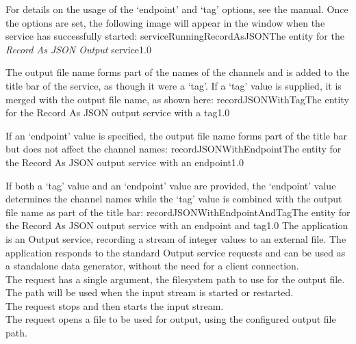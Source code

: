 For details on the usage of the `endpoint' and `tag' options, see the \emph{\CMU} manual.
Once the options are set, the following image will appear in the \emph{\CMU} window when
the service has successfully started:
%
{serviceRunningRecordAsJSON}{The \emph{\CMU} entity for the \emph{Record As JSON Output}
service}{1.0}

The output file name forms part of the names of the channels and is added to the title bar
of the service, as though it were a `tag'.
\condPage{}
If a `tag' value is supplied, it is merged with the output file name, as shown here:
%
{recordJSONWithTag}{The \emph{\CMU} entity for the Record As JSON output service with a
tag}{1.0}

If an `endpoint' value is specified, the output file name forms part of the title bar but
does not affect the channel names:
%
{recordJSONWithEndpoint}{The \emph{\CMU} entity for the Record As JSON output service with
an endpoint}{1.0}

If both a `tag' value and an `endpoint' value are provided, the `endpoint' value
determines the channel names while the `tag' value is combined with the output file name
as part of the title bar:
%
{recordJSONWithEndpointAndTag}{The \emph{\CMU} entity for the Record As JSON output
service with an endpoint and tag}{1.0}
\condPage
{}
The  application is an Output
service, recording a stream of integer values to an external file.
The application responds to the standard Output service requests and can be used as a
standalone data generator, without the need for a client connection.\\

The  request has a single argument,
the file\longDash{}system path to use for the output file.
The path will be used when the input stream is started or restarted.\\

The  request stops and then
starts the input stream.\\

The  request opens a file to be
used for output, using the configured output file path.\\

